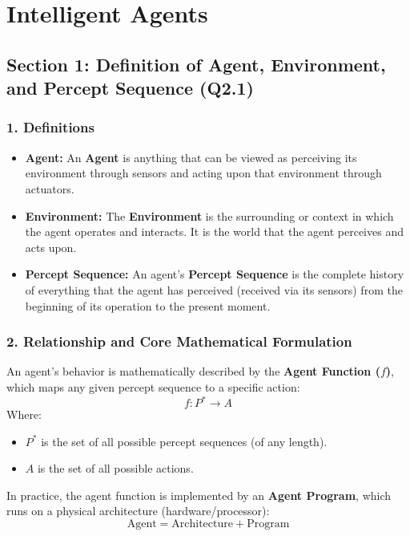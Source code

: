 \chapter{Intelligent Agents}



\section{Section 1: Definition of Agent, Environment, and Percept Sequence (Q2.1)}

\subsection{1. Definitions}

\begin{itemize}
  \item   \textbf{Agent:} An \textbf{Agent} is anything that can be viewed as perceiving its environment through sensors and acting upon that environment through actuators.
  \item   \textbf{Environment:} The \textbf{Environment} is the surrounding or context in which the agent operates and interacts. It is the world that the agent perceives and acts upon.
  \item   \textbf{Percept Sequence:} An agent's \textbf{Percept Sequence} is the complete history of everything that the agent has perceived (received via its sensors) from the beginning of its operation to the present moment.
\end{itemize}

\subsection{2. Relationship and Core Mathematical Formulation}
An agent's behavior is mathematically described by the \textbf{Agent Function ($f$)}, which maps any given percept sequence to a specific action:
\[ f: P^* \rightarrow A \]
Where:
\begin{itemize}
  \item   $P^*$ is the set of all possible percept sequences (of any length).
  \item   $A$ is the set of all possible actions.
\end{itemize}

In practice, the agent function is implemented by an \textbf{Agent Program}, which runs on a physical architecture (hardware/processor):
\[ \text{Agent} = \text{Architecture} + \text{Program} \]


